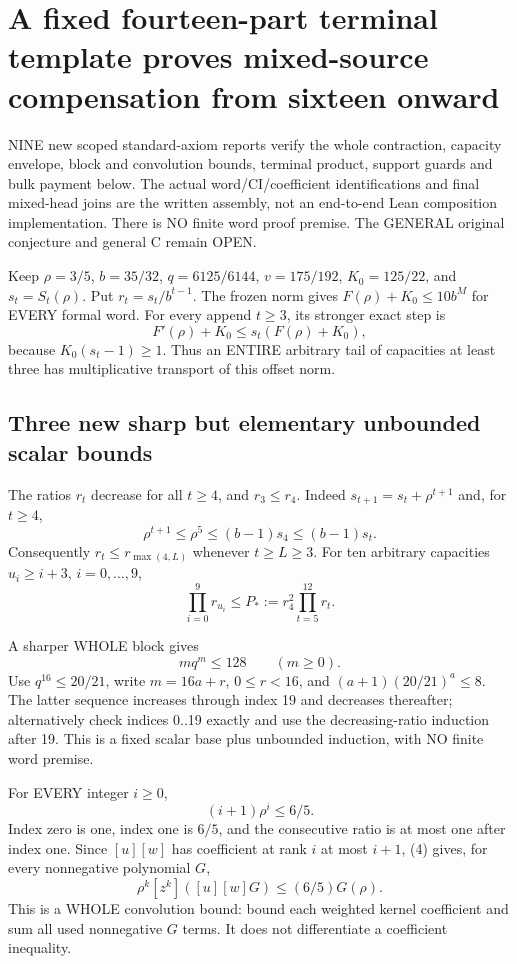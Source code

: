 \section{A fixed fourteen-part terminal template proves mixed-source compensation from sixteen onward}
NINE new scoped standard-axiom reports verify the whole contraction,
capacity envelope, block and convolution bounds, terminal product,
support guards and bulk payment below. The actual word/CI/coefficient
identifications and final mixed-head joins are the written assembly,
not an end-to-end Lean composition implementation. There is NO finite
word proof premise. The GENERAL original conjecture and general C remain OPEN.

Keep $\rho=3/5$, $b=35/32$, $q=6125/6144$, $v=175/192$,
$K_0=125/22$, and $s_t=S_t(\rho)$. Put $r_t=s_t/b^{t-1}$.
The frozen norm gives $F(\rho)+K_0\le10b^M$ for EVERY formal word.
For every append $t\ge3$, its stronger exact step is
\[
       F'(\rho)+K_0\le s_t(F(\rho)+K_0),              \tag{1}
\]
because $K_0(s_t-1)\ge1$. Thus an ENTIRE arbitrary tail of capacities
at least three has multiplicative transport of this offset norm.

\subsection{Three new sharp but elementary unbounded scalar bounds}
The ratios $r_t$ decrease for all $t\ge4$, and $r_3\le r_4$.
Indeed $s_{t+1}=s_t+\rho^{t+1}$ and, for $t\ge4$,
\[
 \rho^{t+1}\le\rho^5\le(b-1)s_4\le(b-1)s_t.
\]
Consequently $r_t\le r_{\max(4,L)}$ whenever $t\ge L\ge3$.
For ten arbitrary capacities $u_i\ge i+3$, $i=0,\ldots,9$,
\[
 \prod_{i=0}^9r_{u_i}\le P_*:=r_4^2\prod_{t=5}^{12}r_t.        \tag{2}
\]

A sharper WHOLE block gives
\[
                      m q^m\le128\qquad(m\ge0).       \tag{3}
\]
Use $q^{16}\le20/21$, write $m=16a+r$, $0\le r<16$, and
$(a+1)(20/21)^a\le8$. The latter sequence increases through index 19
and decreases thereafter; alternatively check indices 0..19 exactly
and use the decreasing-ratio induction after 19. This is a fixed
scalar base plus unbounded induction, with NO finite word premise.

For EVERY integer $i\ge0$,
\[
                       (i+1)\rho^i\le6/5.             \tag{4}
\]
Index zero is one, index one is $6/5$, and the consecutive ratio is
at most one after index one. Since $[u][w]$ has coefficient at rank
$i$ at most $i+1$, (4) gives, for every nonnegative polynomial $G$,
\[
              \rho^k[z^k]([u][w]G)\le(6/5)G(\rho).   \tag{5}
\]
This is a WHOLE convolution bound: bound each weighted kernel
coefficient and sum all used nonnegative $G$ terms. It does not
differentiate a coefficient inequality.

